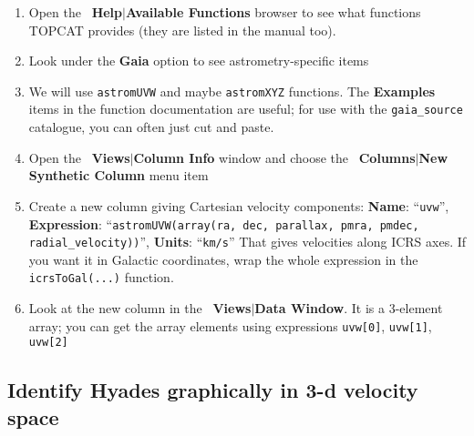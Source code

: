 \documentclass{article}
\newcommand{\buttimg}[1]
           {\mbox{\vtop{\vskip-2ex\hbox{\texttt{[image: \#1]}}}}}
\newcommand{\winfig}[2]
           {\vspace*{-0.5cm}
            \hspace*{0.5cm}\mbox{\vtop{\hbox{\texttt{[image: \#2]}}}}}
\newcommand{\lab}[1]{{\bf #1}}
\newcommand{\mb}[3]{\buttimg{#1}~\lab{#2}$\mid$\lab{#3}}
\newcommand{\entry}[2]{\lab{#1}: ``{\tt #2}''}
\begin{document}
\begin{minipage}[t]{11cm}
  \raggedright
  \begin{enumerate}
  \item Open the \mb{fx_button}{Help}{Available Functions} browser to see
        what functions TOPCAT provides (they are listed in the manual too).
  \item Look under the \lab{Gaia} option to see astrometry-specific items
  \item We will use {\tt astromUVW} and maybe {\tt astromXYZ} functions.
        The \lab{Examples} items in the function documentation are useful;
        for use with the {\tt gaia\_source} catalogue,
        you can often just cut and paste.
  \item Open the \mb{cols_button.png}{Views}{Column Info} window
        and choose the \mb{plus_button.png}{Columns}{New Synthetic Column}
        menu item
  \item Create a new column giving Cartesian velocity components:
        \entry{Name}{uvw},
        \entry{Expression}
          {astromUVW(array(ra, dec, parallax, pmra, pmdec, radial\_velocity))},
        \entry{Units}{km/s}
        That gives velocities along ICRS axes.
        If you want it in Galactic coordinates, wrap the whole expression
        in the {\tt icrsToGal(...)} function.
  \item Look at the new column in the \mb{browser1.png}{Views}{Data Window}.
        It is a 3-element array; you can get the array elements
        using expressions {\tt uvw[0]}, {\tt uvw[1]}, {\tt uvw[2]}
  \end{enumerate}
\end{minipage}
\begin{minipage}[t]{8cm}
  \winfig{width=8cm}{hy_coldef.png}
\end{minipage}

\subsection{Identify Hyades graphically in 3-d velocity space}
\end{document}
